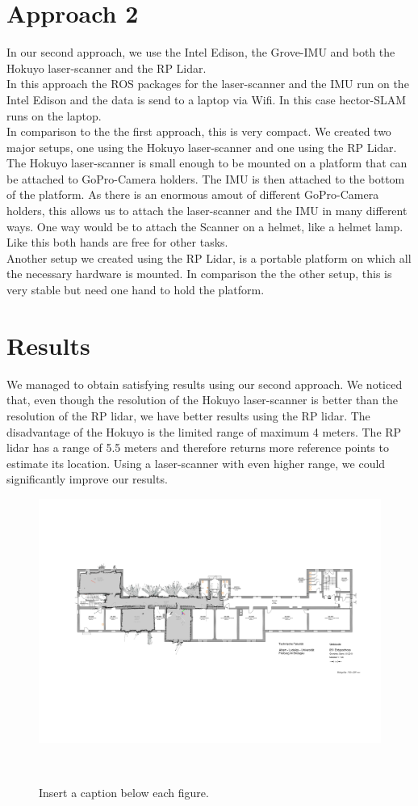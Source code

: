 \documentclass{sigchi-ext}
\begin{document}
\section{Approach 2}
In our second approach, we use the Intel Edison, the Grove-IMU and both the Hokuyo laser-scanner and the RP Lidar.\\
In this approach the ROS packages for the laser-scanner and the IMU run on the Intel Edison and the data is send to a laptop via Wifi. In this case hector-SLAM runs on the laptop.\\
In comparison to the the first approach, this is very compact.
We created two major setups, one using the Hokuyo laser-scanner and one using the RP Lidar. The Hokuyo laser-scanner is small enough to be mounted on a platform that can be attached to GoPro-Camera holders. The IMU is then attached to the bottom of the platform. As there is an enormous amout of different GoPro-Camera holders, this allows us to attach the laser-scanner and the IMU in many different ways. One way would be to attach the Scanner on a helmet, like a helmet lamp. Like this both hands are free for other tasks.\\
Another setup we created using the RP Lidar, is a portable platform on which all the necessary hardware is mounted. In comparison the the other setup, this is very stable but need one hand to hold the platform.\\
\section{Results}
We managed to obtain satisfying results using our second approach. We noticed that, even though the resolution of the Hokuyo laser-scanner is better than the resolution of the RP lidar, we have better results using the RP lidar. The disadvantage of the Hokuyo is the limited range of maximum 4 meters. The RP lidar has a range of 5.5 meters and therefore returns more reference points to estimate its location. Using a laser-scanner with even higher range, we could significantly improve our results.

\begin{figure}
	\includegraphics[width=0.9\columnwidth]{51.png}
	\caption{Insert a caption below each figure.}~\label{fig:sample}
\end{figure}
%
%

\balance{} 
\end{document}
